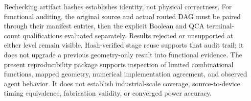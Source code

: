 \documentclass[11pt,a4paper]{article}
\begin{document}
Rechecking artifact hashes establishes identity, not physical correctness. For functional auditing, the original source and actual routed DAG must be paired through their manifest entries, then the explicit Boolean and QCA terminal-count qualifications evaluated separately. Results rejected or unsupported at either level remain visible. Hash-verified stage reuse supports that audit trail; it does not upgrade a previous geometry-only result into functional evidence. The present reproducibility package supports inspection of limited combinational functions, mapped geometry, numerical implementation agreement, and observed agent behavior. It does not establish industrial-scale coverage, source-to-device timing equivalence, fabrication validity, or converged power accuracy.
\end{document}
